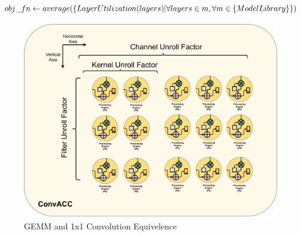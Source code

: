 \begin{equation}
        obj\_fn \gets average (\{LayerUtilization(layers)\space|\space \forall layers \in m, \forall m \in \{ModelLibrary\}\})
    \label{math:tempo_results_obj_fn}
\end{equation}

\begin{figure}[]
    \centering
    \includegraphics[scale=0.4]{fig/axis_mapping.pdf}
    \caption{\ac{GEMM} and 1x1 Convolution Equivelence}
    \label{fig:axis_mapping}
\end{figure}
